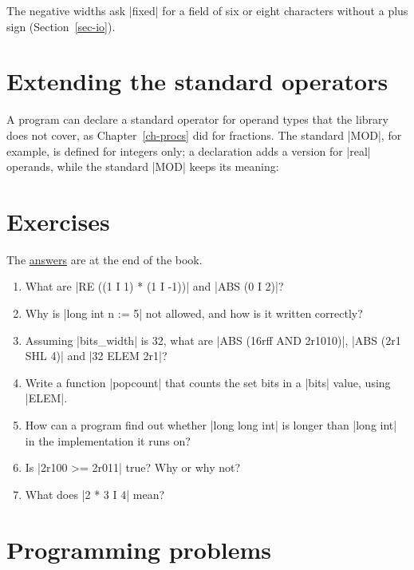 
The negative widths ask \code|fixed| for a field of six or eight
characters without a plus sign (Section~\ref{sec-io}).

\section{Extending the standard operators}\label{sec-extend-ops}

A program can declare a standard operator for operand types that the
library does not cover, as Chapter~\ref{ch-procs} did for fractions. The standard
\code|MOD|, for example, is defined for integers only; a declaration adds
a version for \code|real| operands, while the standard \code|MOD| keeps its
meaning:


\section*{Exercises}

The \hyperref[ans-ch6]{answers} are at the end of the book.

\begin{enumerate}
\item What are \code|RE ((1 I 1) * (1 I -1))| and \code|ABS (0 I 2)|?
\item Why is \code|long int n := 5| not allowed, and how is it written
  correctly?
\item Assuming \code|bits_width| is 32, what are
  \code|ABS (16rff AND 2r1010)|, \code|ABS (2r1 SHL 4)| and
  \code|32 ELEM 2r1|?
\item Write a function \code|popcount| that counts the set bits in a
  \code|bits| value, using \code|ELEM|.
\item How can a program find out whether \code|long long int| is longer
  than \code|long int| in the implementation it runs on?
\item Is \code|2r100 >= 2r011| true? Why or why not?
\item What does \code|2 * 3 I 4| mean?
\end{enumerate}

\section*{Programming problems}

